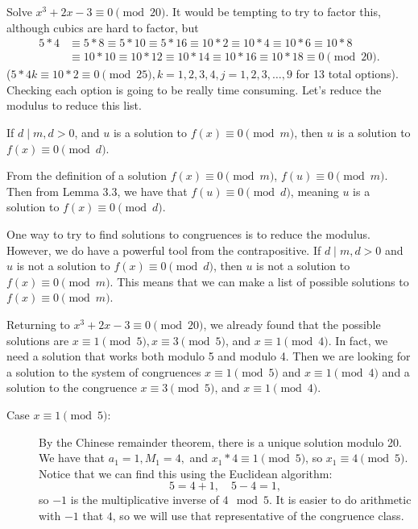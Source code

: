 \documentclass[letterpaper, 11 pt]{article}
\begin{document}
\begin{example}
Solve $x^3+2x-3\equiv 0 \pmod{20}$. It would be tempting to try to factor this, although cubics are hard to factor, but 
\begin{align*}5*4&\equiv 5*8\equiv 5*10\equiv 5*16\equiv 10*2\equiv 10*4\equiv 10*6\equiv 10*8\\&\equiv 10*10\equiv 10*12\equiv10*14\equiv10*16\equiv10*18\equiv 0 \pmod{20}.
 \end{align*}
 ($5*4k\equiv 10*2\equiv 0\pmod{25}, k=1,2,3,4, j=1,2,3,\dots,9$ for 13 total options).
Checking each option is going to be really time consuming. Let's reduce the modulus to reduce this list.

\begin{br}[5 minutes]
 If $d\mid m, d>0$, and $u$ is a solution to $f(x)\equiv 0 \pmod m$, then $u$ is a solution to $f(x)\equiv 0 \pmod d$.
\end{br}
\begin{solution}
 From the definition of a solution $f(x)\equiv 0 \pmod m$, $f(u)\equiv 0\pmod m$. Then from Lemma 3.3, we have that $f(u)\equiv 0 \pmod d$, meaning  $u$ is a solution to $f(x)\equiv 0 \pmod d$.
\end{solution}


One way to try to find solutions to congruences is to reduce the modulus. 
However, we do have a powerful tool from the contrapositive. If $d\mid m, d>0$ and $u$ is not a solution to $f(x)\equiv 0 \pmod d$, then $u$ is not a solution to $f(x)\equiv 0 \pmod m$. This means that we can make a list of possible solutions to $f(x)\equiv 0 \pmod m$.


Returning to $x^3+2x-3\equiv 0 \pmod{20}$,
we already found that the possible solutions are $x\equiv 1 \pmod 5, x\equiv 3\pmod 5$, and $x\equiv 1 \pmod 4$. In fact, we need a solution that works both modulo 5 and modulo 4. Then we are looking for a solution to the system of congruences $x\equiv 1 \pmod 5$ and $x\equiv 1 \pmod 4$ and a solution to the congruence $x\equiv 3\pmod 5$, and $x\equiv 1 \pmod 4$.
\begin{description}
 \item [Case $x\equiv 1 \pmod 5$:] By the Chinese remainder theorem, there is a unique solution modulo 20. We have that $a_1=1, M_1=4,$ and $x_1*4\equiv 1 \pmod 5$, so $x_1\equiv 4 \pmod 5$. Notice that we can find this using the Euclidean algorithm:\[5=4+1,\quad 5-4=1,\] so $-1$ is the multiplicative inverse of $4 \mod 5$. It is easier to do arithmetic with $-1$ that $4$, so we will use that representative of the congruence class.
 

\end{description}
\end{example}
\end{document}
